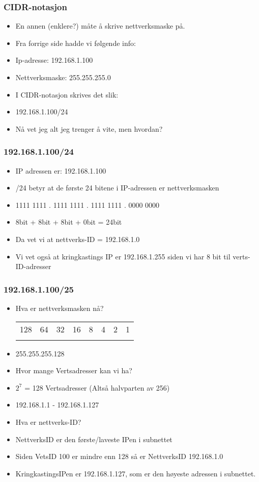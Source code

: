 \documentclass[aspectratio=169,xcolor=dvipsnames]{beamer}
\begin{document}
\begin{frame}
	\frametitle{CIDR-notasjon}

			\begin{itemize}
				\item En annen (enklere?) måte å skrive nettverksmaske på.
				\item Fra forrige side hadde vi følgende info:
				\item Ip-adresse: 192.168.1.100
				\item Nettverksmaske: 255.255.255.0
				\item I CIDR-notasjon skrives det slik:
				\item 192.168.1.100/24
				\item Nå vet jeg alt jeg trenger å vite, men hvordan?
			\end{itemize}
\end{frame}
\begin{frame}
	\frametitle{192.168.1.100/24}

			\begin{itemize}
				\item IP adressen er: 192.168.1.100
				\item /24 betyr at de første 24 bitene i IP-adressen er nettverksmasken
				\item 1111 1111 . 1111 1111 . 1111 1111 . 0000 0000
				\item     8bit  +     8bit  +     8bit  +     0bit = 24bit 
				\item Da vet vi at nettverks-ID = 192.168.1.0
				\item Vi vet også at kringkastings IP er 192.168.1.255 siden vi har 8 bit til verts-ID-adresser
			\end{itemize}
\end{frame}
\begin{frame}
	\frametitle{192.168.1.100/25}

			\begin{itemize}
				\item Hva er nettverksmasken nå?
\begin{center}
\begin{tabular}{ c c c c c c c c}
128 & 64 	& 32 	& 16 	& 8  	& 4	& 2	&  1\\
 &  	&  	&  	&   	& 	& 	&  \\
\end{tabular}
\end{center}
				\item 255.255.255.128
				\item Hvor mange Vertsadresser kan vi ha?
				\item $2^7$ = 128 Vertsadresser (Altså halvparten av 256)
				\item 192.168.1.1 - 192.168.1.127
				\item Hva er nettverks-ID?
				\item NettverksID er den første/laveste IPen i subnettet
				\item Siden VetsID 100 er mindre enn 128 så er NettverksID 192.168.1.0
				\item KringkastingsIPen er 192.168.1.127, som er den høyeste adressen i subnettet.
			\end{itemize}
\end{frame}
\end{document}
